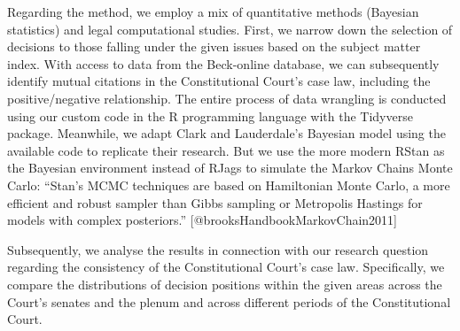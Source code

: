 \documentclass[
]{article}
\begin{document}
Regarding the method, we employ a mix of quantitative methods (Bayesian
statistics) and legal computational studies. First, we narrow down the
selection of decisions to those falling under the given issues based on
the subject matter index. With access to data from the Beck-online
database, we can subsequently identify mutual citations in the
Constitutional Court's case law, including the positive/negative
relationship. The entire process of data wrangling is conducted using
our custom code in the R programming language with the Tidyverse
package. Meanwhile, we adapt Clark and Lauderdale's Bayesian model using
the available code to replicate their research. But we use the more
modern RStan as the Bayesian environment instead of RJags to simulate
the Markov Chains Monte Carlo: ``Stan's MCMC techniques are based on
Hamiltonian Monte Carlo, a more efficient and robust sampler than Gibbs
sampling or Metropolis Hastings for models with complex posteriors.''
{[}@brooksHandbookMarkovChain2011{]}

Subsequently, we analyse the results in connection with our research
question regarding the consistency of the Constitutional Court's case
law. Specifically, we compare the distributions of decision positions
within the given areas across the Court's senates and the plenum and
across different periods of the Constitutional Court.
\end{document}
